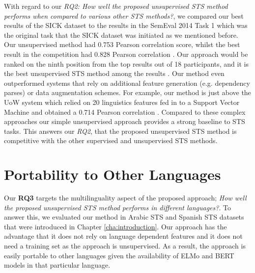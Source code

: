 \begin{enumerate}
With regard to our \textit{RQ2: How well the proposed unsupervised STS method performs when compared to various other STS methods?}, we compared our best results of the SICK dataset to the results in the SemEval 2014 Task 1 \cite{marelli-etal-2014-semeval} which was the original task that the SICK dataset was initiated as we mentioned before. Our unsupervised method had 0.753 Pearson correlation score, whilst the best result in the competition had 0.828 Pearson correlation \cite{marelli-etal-2014-semeval}. Our approach would be ranked on the ninth position from the top results out of 18 participants, and it is the best unsupervised STS method among the results \cite{marelli-etal-2014-semeval}. Our method even outperformed systems that rely on additional feature generation (e.g. dependency parses) or data augmentation schemes. For example, our method is just above the UoW system which relied on 20 linguistics features fed in to a Support Vector Machine and obtained a 0.714 Pearson correlation \cite{gupta-etal-2014-uow}. Compared to these complex approaches our simple unsupervised approach provides a strong baseline to STS tasks. This answers our \textit{RQ2}, that the proposed unsupervised STS method is competitive with the other supervised and unsupervised STS methods. 

\end{enumerate}


\section{Portability to Other Languages}
\label{sec:state_languages}
Our \textbf{RQ3} targets the multilinguality aspect of the proposed approach; \textit{How well the proposed unsupervised STS method performs in different languages?}. To answer this, we evaluated our method in Arabic STS and Spanish STS datasets that were introduced in Chapter \ref{cha:introduction}. Our approach has the advantage that it does not rely on language dependent features and it does not need a training set as the approach is unsupervised. As a result, the approach is easily portable to other languages given the availability of ELMo and BERT models in that particular language. 

